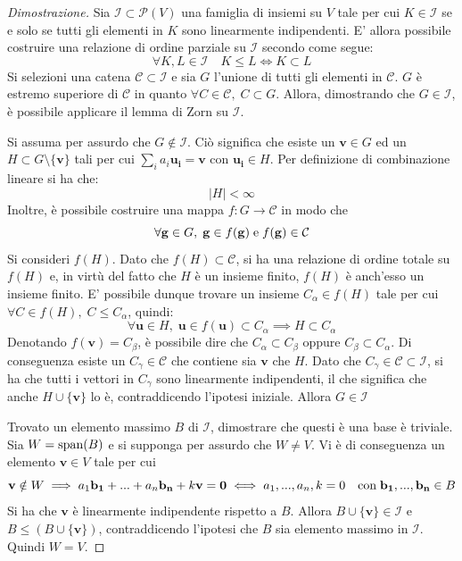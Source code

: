 \documentclass{article}
\begin{document}
    \begin{proof}[Dimostrazione]
        Sia $\mathcal{I} \subset \mathcal{P}(V)$ una famiglia di insiemi su $V$ tale per cui $K \in \mathcal{I}$ se e solo se tutti gli elementi in $K$ sono linearmente indipendenti.
        E' allora possibile costruire una relazione di ordine parziale su $\mathcal{I}$ secondo come segue:
        \[
            \forall K, L \in \mathcal{I} \quad K \leq L \iff K \subset L
        \]
        Si selezioni una catena $\mathcal{C} \subset \mathcal{I}$ e sia $G$ l'unione di tutti gli elementi in $\mathcal{C}$.
        $G$ è estremo superiore di $\mathcal{C}$ in quanto $\forall C \in \mathcal{C}, \; C \subset G$. Allora, dimostrando che $G \in \mathcal{I}$, è possibile applicare il lemma di Zorn su $\mathcal{I}$.

        \vspace{5pt}
        Si assuma per assurdo che $G \notin \mathcal{I}$. Ciò significa che esiste un $\mathbf{v} \in G$ ed un $H \subset G \setminus \{\mathbf{v}\}$ tali per cui $\sum_{i} a_{i} \mathbf{u_{i}} = \mathbf{v}$ con $\mathbf{u_{i}} \in H$. Per definizione di combinazione lineare si ha che:
        \[
            |H| < \infty
        \]
        Inoltre, è possibile costruire una mappa $f: G \rightarrow \mathcal{C}$ in modo che
        \[
            \forall \mathbf{g} \in G, \; \mathbf{g} \in f(\mathbf{g}) \; \textnormal{e} \; f(\mathbf{g}) \in \mathcal{C} 
        \]
        Si consideri $f(H)$. Dato che $f(H) \subset \mathcal{C}$, si ha una relazione di ordine totale su $f(H)$ e, in virtù del fatto che $H$ è un insieme finito, $f(H)$ è anch'esso un insieme finito.
        E' possibile dunque trovare un insieme $C_{\alpha} \in f(H)$ tale per cui $\forall C \in f(H), \; C \leq C_{\alpha}$, quindi:
        \[
            \forall \mathbf{u} \in H, \; \mathbf{u} \in f(\mathbf{u}) \subset C_{\alpha} \implies H \subset C_{\alpha}
        \]
        Denotando $f(\mathbf{v}) = C_{\beta}$, è possibile dire che $C_{\alpha} \subset C_{\beta}$ oppure $C_{\beta} \subset C_{\alpha}$. Di conseguenza esiste un $C_{\gamma} \in \mathcal{C}$ che contiene sia $\mathbf{v}$ che $H$. Dato che $C_{\gamma} \in \mathcal{C} \subset \mathcal{I}$, si ha che tutti i vettori in $C_{\gamma}$ sono
        linearmente indipendenti, il che significa che anche $H \cup \{\mathbf{v}\}$ lo è, contraddicendo l'ipotesi iniziale. Allora $G \in \mathcal{I}$ 

        \vspace{10pt}
        Trovato un elemento massimo $B$ di $\mathcal{I}$, dimostrare che questi è una base è triviale. Sia $W = \textnormal{span}(B)$ e si supponga per assurdo che 
        $W \neq V$. Vi è di conseguenza un elemento $\mathbf{v} \in V$ tale per cui 
        \[
            \mathbf{v} \notin W \implies a_1 \mathbf{b_1} + ... + a_n \mathbf{b_n} + k \mathbf{v} = \mathbf{0} \iff a_1, ..., a_n, k = 0 \quad \textnormal{con} \; \mathbf{b_1}, ..., \mathbf{b_n} \in B
        \]
        Si ha che $\mathbf{v}$ è linearmente indipendente rispetto a $B$. Allora $B \cup \{\mathbf{v}\} \in \mathcal{I}$ e $B \leq (B \cup \{\mathbf{v}\})$, contraddicendo l'ipotesi che $B$ sia elemento massimo in $\mathcal{I}$. Quindi $W = V$.


\end{proof}
\end{document}
